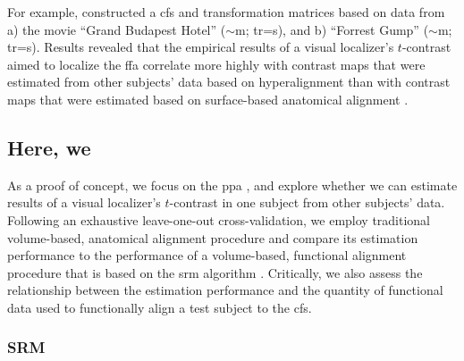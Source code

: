 For example, \citep{jiahui2020predicting} constructed a \ac{cfs} and
transformation matrices based on data from a) the movie ``Grand Budapest Hotel''
($\sim$\unit[50]{m}; \ac{tr}=\unit[1]{s}), and b) ``Forrest Gump''
($\sim$\unit[120]{m}; \ac{tr}=\unit[2]{s}).
Results revealed that the empirical results of a visual localizer's $t$-contrast
aimed to localize the \ac{ffa} correlate more highly with contrast maps that
were estimated from other subjects' data based on hyperalignment than with
contrast maps that were estimated based on surface-based anatomical alignment
\citep{jiahui2020predicting}.


\subsection{Here, we}





As a proof of concept, we focus on the \ac{ppa} \citep[e.g.,][for
reviews]{epstein2014neural, aminoff2013role}, and explore whether we can
estimate results of a visual localizer's $t$-contrast in one subject from other
subjects' data.
%
Following an exhaustive leave-one-out cross-validation, we employ traditional
volume-based, anatomical alignment procedure and compare its estimation
performance to the performance of a volume-based, functional alignment procedure
that is based on the \ac{srm} algorithm \citep{chen2015reduced,
richard2019fast}.
Critically, we also assess the relationship between the estimation performance
and the quantity of functional data used to functionally align a test subject to
the \ac{cfs}.



\subsubsection{SRM}

